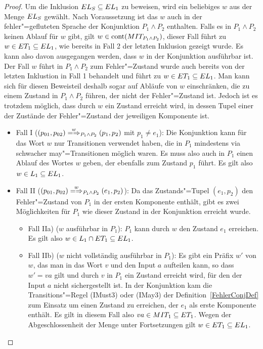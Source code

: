 \begin{proof}
  Um die Inklusion $EL _S\subseteq EL _1$ zu beweisen, wird ein beliebiges $w$
  aus der Menge $EL _S$ gewählt. Nach Voraussetzung ist das $w$ auch in der
  fehler"=gefluteten Sprache der Konjunktion $P_1\land P_2$ enthalten. Falls
  es in $P_1\land P_2$ keinen Ablauf für $w$ gibt, gilt $w\in\mathrm{cont} (MIT
  _{P_1\land P_2})$, dieser Fall führt zu $w\in ET _1\subseteq EL _1$, wie
  bereits in Fall 2 der letzten Inklusion gezeigt wurde. Es kann also davon
  ausgegangen werden, dass $w$ in der Konjunktion ausführbar ist. Der Fall $w$
  führt in $P_1\land P_2$ zum Fehler"=Zustand wurde auch bereits von der
  letzten Inklustion in Fall 1 behandelt und führt zu $w\in ET _1\subseteq EL
  _1$. Man kann sich für diesen Beweisteil deshalb sogar auf Abläufe von $w$
  einschränken, die zu einem Zustand in $P_1\land P_2$ führen, der nicht der
  Fehler"=Zustand ist. Jedoch ist es trotzdem möglich, dass durch $w$ ein
  Zustand erreicht wird, in dessen Tupel einer der Zustände der Fehler"=Zustand
  der jeweiligen Komponente ist.
  \begin{itemize}
    \item Fall I ($(p_{01},p_{02})\weakmay[w]_{P_1\land P_2} (p_1,p_2)$ mit
      $p_1\neq e_1$): Die Konjunktion kann für das Wort $w$ nur Transitionen
      verwendet haben, die in $P_1$ mindestens via schwacher may"=Transitionen
      möglich waren. Es muss also auch in $P_1$ einen Ablauf des Wortes $w$
      geben, der ebenfalls zum Zustand $p_1$ führt. Es gilt also $w\in L_1
      \subseteq EL _1$.
    \item Fall II ($(p_{01},p_{02})\weakmay[w]_{P_1\land P_2} (e_1,p_2)$): Da
      das Zustands"=Tupel $(e_1,p_2)$ den Fehler"=Zustand von $P_1$ in der
      ersten Komponente enthält, gibt es zwei Möglichkeiten für $P_1$ wie
      dieser Zustand in der Konjunktion erreicht wurde.
      \begin{itemize}
        \item Fall IIa) ($w$ ausführbar in $P_1$): $P_1$ kann durch $w$ den
          Zustand $e_1$ erreichen. Es gilt also $w\in L_1\cap ET _1\subseteq
          EL _1$.
        \item Fall IIb) ($w$ nicht vollständig ausführbar in $P_1$): Es gibt
          ein Präfix $w'$ von $w$, das man in das Wort $v$ und den Input $a$
          aufteilen kann, so dass $w'=va$ gilt und durch $v$ in $P_1$ ein
          Zustand erreicht wird, für den der Input $a$ nicht sichergestellt
          ist. In der Konjunktion kam die Transitions"=Regel (IMust3) oder
          (IMay3) der Definition~\ref{FehlerConjDef} zum Einsatz um einen Zustand zu
          erreichen, der $e_1$ als erste Komponente enthält. Es gilt in diesem
          Fall also $va\in MIT _1\subseteq ET _1$. Wegen der Abgeschlossenheit
          der Menge \ET{} unter Fortsetzungen gilt $w\in ET _1
      \subseteq EL _1$.
      \end{itemize}
  \end{itemize}
\end{proof}
